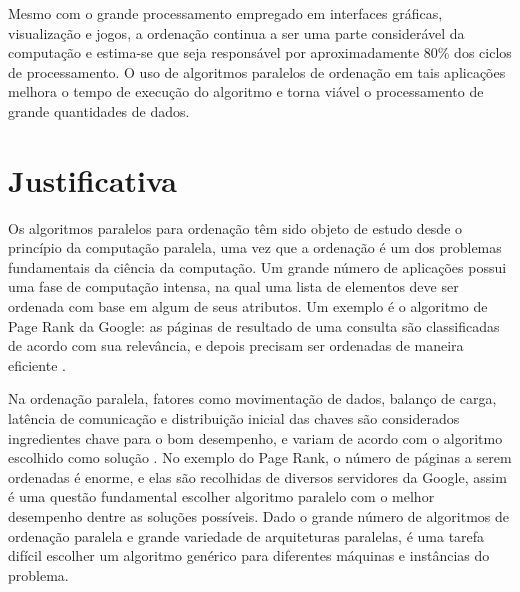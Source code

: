 Mesmo com o grande processamento  empregado em interfaces gráficas, visualização e jogos, a ordenação continua a ser uma parte considerável da computação e estima-se que seja responsável por aproximadamente 80\% dos ciclos de processamento\cite{Ranger:2007}. O uso de algoritmos paralelos de ordenação em tais aplicações melhora o tempo de execução do algoritmo e torna viável o processamento de grande quantidades de dados.


\section{Justificativa}
\label{sec:justificativa}

Os algoritmos paralelos para ordenação têm sido objeto de estudo desde o princípio da computação paralela, uma vez que a  ordenação é um dos problemas fundamentais da ciência da computação.
Um grande número de aplicações possui uma fase de computação intensa, na qual uma lista de elementos deve ser ordenada com base em algum de seus atributos. Um exemplo é o algoritmo de Page Rank \cite{Page:1999} da Google: as páginas de resultado de uma consulta são classificadas de acordo com sua relevância, e depois precisam ser ordenadas de maneira eficiente \cite{Kale:2010}. 
 




Na ordenação paralela, fatores como movimentação de dados, balanço de carga, latência de comunicação e distribuição inicial das chaves são considerados ingredientes chave para o bom desempenho, e variam de acordo com o algoritmo escolhido como solução \cite{Kale:2010}.  No exemplo do Page Rank, o número de páginas a serem ordenadas é enorme, e elas são recolhidas de diversos servidores da Google, assim é uma questão fundamental escolher algoritmo paralelo com o melhor desempenho dentre as soluções possíveis.
Dado o grande número de algoritmos de ordenação paralela e grande variedade de arquiteturas paralelas, é uma tarefa difícil escolher um algoritmo genérico para diferentes máquinas e instâncias do problema.

